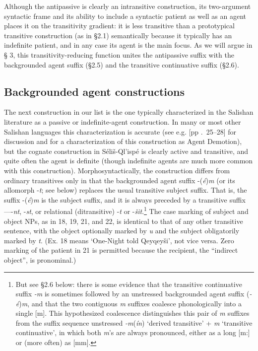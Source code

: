 \documentclass[output=paper,colorlinks,citecolor=brown]{langscibook}
\begin{document}
\bigskip

Although the antipassive is clearly an intransitive construction, its
two-argument syntactic frame and its ability to include a syntactic
patient as well as an agent places it on the transitivity gradient: it
is less transitive than a prototypical transitive construction (as in
\S 2.1) semantically because it typically has an indefinite patient,
and in any case its agent is the main focus.  As we will argue in \S
3, this transitivity-reducing function unites the antipassive suffix
with the backgrounded agent suffix (\S 2.5) and the transitive
continuative suffix (\S 2.6).

\subsection{Backgrounded agent constructions} %

The next construction in our list is the one typically characterized
in the Salishan literature as a passive or indefinite-agent
construction.  In many or most other Salishan languages this
characterization is accurate (see e.g. \cite{Kroeber:1999}[pp .~25--28] for
discussion and for a characterization of this construction as Agent
Demotion), but the cognate construction in S\'eli\v{s}-Ql'isp\'e is
clearly active and transitive, and quite often the agent is definite
(though indefinite agents are much more common with this
construction).  Morphosyntactically, the construction differs from
ordinary transitives only in that the backgrounded agent suffix -(\emph{\'e})\emph{m} (or its allomorph -\emph{t}; see below) replaces the
usual transitive subject suffix.  That is, the suffix -(\emph{\'e})\emph{m} is the subject suffix, and it is always preceded by a transitive
suffix---{-\emph{nt}}, -\emph{st}, or relational (ditransitive) -\emph{{\textltilde}t} or -\emph{\v{s}it}.\footnote{But see \S 2.6 below:
there is some evidence that the transitive continuative suffix \emph{-m} is sometimes followed by an unstressed backgrounded agent suffix
(\emph{-\'e})\emph{m}, and that the two contiguous \emph{m} suffixes
coalesce phonologically into a single [m].  This hypothesized
coalescence distinguishes this pair of \emph{m} suffixes from the
suffix sequence unstressed \emph{-m}(\emph{\'in}) `derived transitive' +
\emph{m} `transitive continuative', in which both \emph{m}'s are always
pronounced, either as a long [m:] or (more often) as [m{\textschwa}m].
} The case marking of subject and object NPs, as in 18, 19, 21, and
22, is identical to that of any other transitive sentence, with the
object optionally marked by \emph{{\textltilde}u} and the subject
obligatorily marked by \emph{t}.  (Ex. 18 means `One-Night told
Qeyqey\v{s}i', not vice versa.  Zero marking of the patient in 21 is
permitted because the recipient, the ``indirect object'', is
pronominal.)
\end{document}
